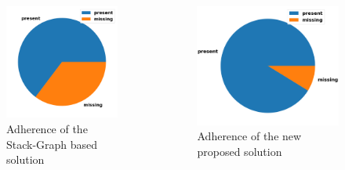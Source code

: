 \documentclass[dvipsnames, 10pt, table]{beamer}
\begin{document}
\begin{frame}
\begin{columns}
\begin{column}{0.3\textwidth}
\begin{figure}
\begin{center}
          \includegraphics[width=1.0\textwidth]{figures/testing/pie-plot-java-refolli.png}
          \caption{Adherence of the Stack-Graph based solution}
        \end{center}
      \end{figure}
    \end{column}
    \begin{column}{0.33\textwidth}
      \begin{figure}
        \begin{center}
          \includegraphics[width=1.0\textwidth]{figures/testing/pie-plot-java-teruzzi.png}
          \caption{Adherence of the new proposed solution}
        \end{center}
      \end{figure}
    \end{column}
  \end{columns}
\end{frame}
\end{document}
